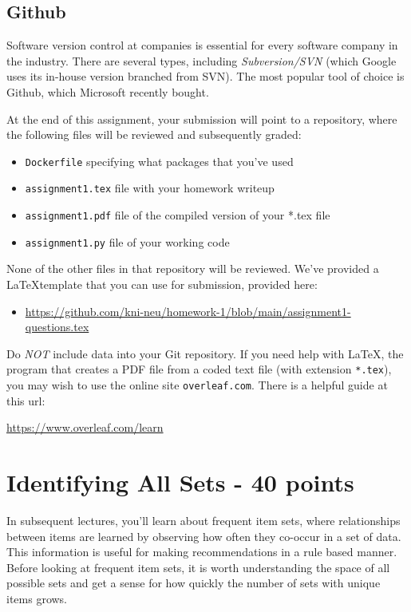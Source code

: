 \documentclass[paper=a4, fontsize=11pt]{scrartcl} %
\begin{document}
\subsection{Github}

Software version control at companies is essential for every software company in the industry. There are several types, including \emph{Subversion/SVN} (which Google uses its in-house version branched from SVN). The most popular tool of choice is Github, which Microsoft recently bought. 

At the end of this assignment, your submission will point to a repository, where the following files will be reviewed and subsequently graded:

\begin{itemize}
    \item \verb"Dockerfile" specifying what packages that you've used
    \item \verb"assignment1.tex" file with your homework writeup
    \item \verb"assignment1.pdf" file of the compiled version of your *.tex file
    \item \verb"assignment1.py" file of your working code
\end{itemize}

None of the other files in that repository will be reviewed. We've provided a \LaTeX template that you can use for submission, provided here:
\begin{itemize}
    \item \url{https://github.com/kni-neu/homework-1/blob/main/assignment1-questions.tex}
\end{itemize}

Do \emph{NOT} include data into your Git repository. If you need help with \LaTeX, the program that creates a PDF file from a coded text file (with extension \verb"*.tex"), you may wish to use the online site \verb"overleaf.com". There is a helpful guide at this url:

\url{https://www.overleaf.com/learn}

\section{Identifying All Sets - 40 points}

In subsequent lectures, you'll learn about frequent item sets, where relationships between items are learned by observing how often they co-occur in a set of data. This information is useful for making recommendations in a rule based manner. Before looking at frequent item sets, it is worth understanding the space of all possible sets and get a sense for how quickly the number of sets with unique items grows.
\end{document}
